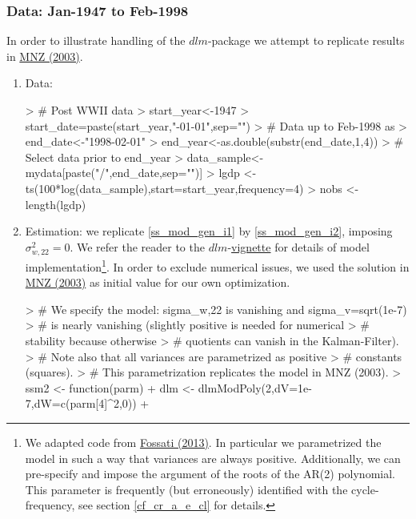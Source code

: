 \documentclass[a4paper]{book}
\begin{document}
\subsubsection{Data: Jan-1947 to Feb-1998}

In order to illustrate handling of the $dlm$-package we attempt to replicate results in \href{https://www.dropbox.com/s/1qn5h7s02c86j8i/mnz03.pdf?dl=0}{MNZ (2003)}. 

\begin{enumerate}
\item Data:
\begin{Schunk}
\begin{Sinput}
> # Post WWII data
> start_year<-1947 
> start_date=paste(start_year,"-01-01",sep="")
> # Data up to Feb-1998 as 
> end_date<-"1998-02-01"
> end_year<-as.double(substr(end_date,1,4))
> # Select data prior to end_year
> data_sample<-mydata[paste("/",end_date,sep="")]
> lgdp <- ts(100*log(data_sample),start=start_year,frequency=4)
> nobs <- length(lgdp)
\end{Sinput}
\end{Schunk}
\item Estimation: we replicate \ref{ss_mod_gen_i1} by \ref{ss_mod_gen_i2}, imposing $\sigma_{w,22}^2=0$. We refer the reader to the $dlm$-\href{http://cran.r-project.org/web/packages/dlm/vignettes/dlm.pdf}{vignette} for details of model implementation\footnote{We adapted code from \href{https://www.ualberta.ca/~sfossati/e509/files/slides/lec5.r}{Fossati (2013)}. In particular we parametrized the model in such a way that variances are always positive. Additionally, we can pre-specify and impose the argument of the roots of the AR(2) polynomial. This parameter is frequently (but erroneously) identified with the cycle-frequency, see section \ref{cf_cr_a_e_cl} for details.}. In order to exclude numerical issues, we used the solution in \href{https://www.dropbox.com/s/1qn5h7s02c86j8i/mnz03.pdf?dl=0}{MNZ (2003)} as initial value for our own optimization.
\begin{Schunk}
\begin{Sinput}
> # We specify the model: sigma_{w,22} is vanishing and sigma_v=sqrt(1e-7) 
> #   is nearly vanishing (slightly positive is needed for numerical 
> #   stability because otherwise 
> #   quotients can vanish in the Kalman-Filter).
> # Note also that all variances are parametrized as positive 
> #   constants (squares).
> # This parametrization replicates the model in MNZ (2003).
> ssm2 <- function(parm){
+   dlm <- dlmModPoly(2,dV=1e-7,dW=c(parm[4]^2,0)) + 
}
\end{Sinput}
\end{Schunk}
\end{enumerate}
\end{document}
